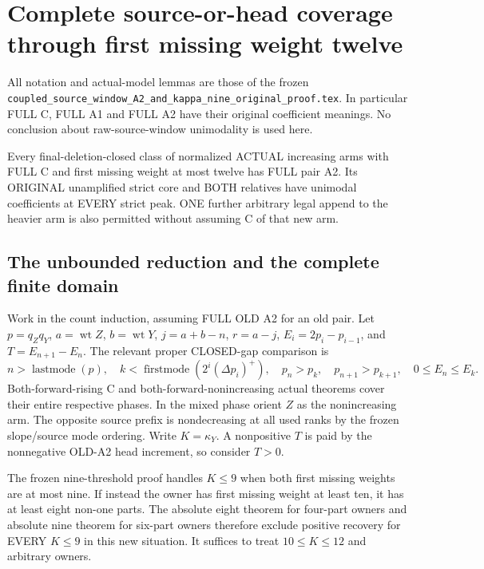 \section{Complete source-or-head coverage through first missing weight twelve}
All notation and actual-model lemmas are those of the frozen
\texttt{coupled\_source\_window\_A2\_and\_kappa\_nine\_original\_proof.tex}.
In particular FULL C, FULL A1 and FULL A2 have their original coefficient
meanings. No conclusion about raw-source-window unimodality is used here.

\begin{theorem}
Every final-deletion-closed class of normalized ACTUAL increasing arms
with FULL C and first missing weight at most twelve has FULL pair A2.
Its ORIGINAL unamplified strict core and BOTH relatives have unimodal
coefficients at EVERY strict peak. ONE further arbitrary legal append
to the heavier arm is also permitted without assuming C of that new arm.
\end{theorem}

\subsection{The unbounded reduction and the complete finite domain}
Work in the count induction, assuming FULL OLD A2 for an old pair.
Let $p=q_Zq_Y$, $a=\operatorname{wt}Z$, $b=\operatorname{wt}Y$,
$j=a+b-n$, $r=a-j$, $E_i=2p_i-p_{i-1}$, and
$T=E_{n+1}-E_n$. The relevant proper CLOSED-gap comparison is
\[
 n>\operatorname{lastmode}(p),\quad k<\operatorname{firstmode}(2^i(\Delta p_i)^+),
 \quad p_n>p_k,\quad p_{n+1}>p_{k+1},\quad 0\le E_n\le E_k.
\]
Both-forward-rising C and both-forward-nonincreasing actual theorems
cover their entire respective phases. In the mixed phase orient $Z$ as
the nonincreasing arm. The opposite source prefix is nondecreasing at
all used ranks by the frozen slope/source mode ordering. Write
$K=\kappa_Y$. A nonpositive $T$ is paid by the nonnegative OLD-A2
head increment, so consider $T>0$.

The frozen nine-threshold proof handles $K\le9$ when both first
missing weights are at most nine. If instead the owner has first missing
weight at least ten, it has at least eight non-one parts. The absolute
eight theorem for four-part owners and absolute nine theorem for six-part
owners therefore exclude positive recovery for EVERY $K\le9$ in this
new situation. It suffices to treat $10\le K\le12$ and arbitrary owners.

